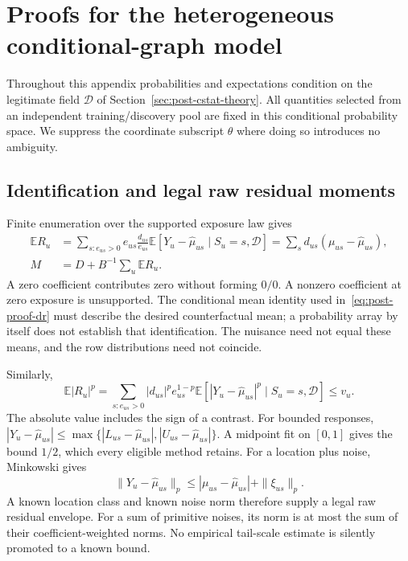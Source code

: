 \section{Proofs for the heterogeneous conditional-graph model}
\label{app:post-proofs}

Throughout this appendix probabilities and expectations condition on the
legitimate field $\mathcal D$ of Section~\ref{sec:post-cstat-theory}. All
quantities selected from an independent training/discovery pool are fixed in
this conditional probability space. We suppress the coordinate subscript
$\theta$ where doing so introduces no ambiguity.

\subsection{Identification and legal raw residual moments}

Finite enumeration over the supported exposure law gives
\begin{align}
 \mathbb E R_u
 &=\sum_{s:e_{us}>0}e_{us}\frac{d_{us}}{e_{us}}
       \mathbb E[Y_u-\widehat\mu_{us}\mid S_u=s,\mathcal D]
   =\sum_s d_{us}(\mu_{us}-\widehat\mu_{us}),
 \label{eq:post-proof-dr}\\
 M&=D+B^{-1}\sum_u\mathbb E R_u.
 \nonumber
\end{align}
A zero coefficient contributes zero without forming $0/0$. A nonzero
coefficient at zero exposure is unsupported. The conditional mean identity
used in~\eqref{eq:post-proof-dr} must describe the desired counterfactual
mean; a probability array by itself does not establish that identification.
The nuisance need not equal these means, and the row distributions need not
coincide.

Similarly,
\begin{equation}
 \mathbb E|R_u|^p
 =\sum_{s:e_{us}>0}|d_{us}|^p e_{us}^{1-p}
       \mathbb E[|Y_u-\widehat\mu_{us}|^p\mid S_u=s,\mathcal D]
 \leq v_u.
 \label{eq:post-proof-raw-moment}
\end{equation}
The absolute value includes the sign of a contrast. For bounded responses,
$|Y_u-\widehat\mu_{us}|\leq\max\{|L_{us}-\widehat\mu_{us}|,
|U_{us}-\widehat\mu_{us}|\}$. A midpoint fit on $[0,1]$ gives the bound
$1/2$, which every eligible method retains. For a location plus noise,
Minkowski gives
\begin{equation}
 \|Y_u-\widehat\mu_{us}\|_p
 \leq|\mu_{us}-\widehat\mu_{us}|+\|\xi_{us}\|_p.
 \label{eq:post-proof-location}
\end{equation}
A known location class and known noise norm therefore supply a legal raw
residual envelope. For a sum of primitive noises, its norm is at most the sum
of their coefficient-weighted norms. No empirical tail-scale estimate is
silently promoted to a known bound.


